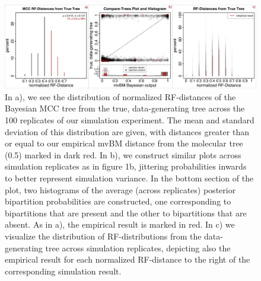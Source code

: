 \begin{figure}[h]
\centering
\includegraphics[width=160mm]{figures/harvati_figure3_final_redo.pdf}
\caption[Visualizing Results of Empirically Parameterized Simulation Study Relative to Empirical Result]{In a), we see the distribution of normalized RF-distances of the Bayesian MCC tree from the true, data-generating tree across the 100 replicates of our simulation experiment. The mean and standard deviation of this distribution are given, with distances greater than or equal to our empirical mvBM distance from the molecular tree (0.5) marked in dark red. In b), we construct similar plots across simulation replicates as in figure 1b, jittering probabilities inwards to better represent simulation variance. In the bottom section of the plot, two histograms of the average (across replicates) posterior bipartition probabilities are constructed, one corresponding to bipartitions that are present and the other to bipartitions that are absent. As in a), the empirical result is marked in red. In c) we visualize the distribution of RF-distributions from the data-generating tree across simulation replicates, depicting also the empirical result for each normalized RF-distance to the right of the corresponding simulation result. \label{overflow}
\label{fig:harvatiFigure3}}
\end{figure}

